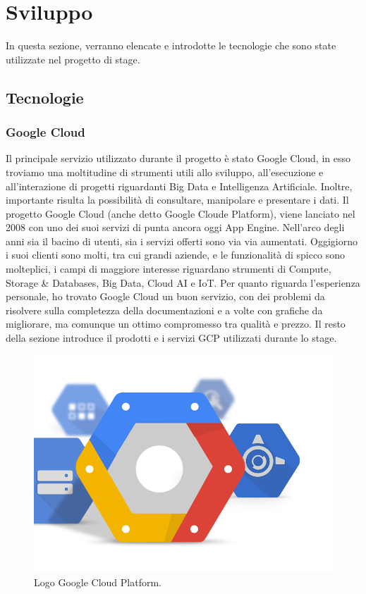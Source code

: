 \chapter{Sviluppo}
In questa sezione, verranno elencate e introdotte le tecnologie che sono state utilizzate nel progetto di stage.
\section{Tecnologie}
\subsection{Google Cloud}
Il principale servizio utilizzato durante il progetto è stato Google Cloud, in esso troviamo una moltitudine di strumenti utili allo sviluppo, all'esecuzione e all'interazione di progetti riguardanti Big Data e Intelligenza Artificiale. Inoltre, importante risulta la possibilità di consultare, manipolare e presentare i dati.
Il progetto Google Cloud (anche detto Google Cloude Platform), viene lanciato nel 2008 con uno dei suoi servizi di punta ancora oggi  \gls{App Engine}. Nell'arco degli anni sia il bacino di utenti, sia i servizi offerti sono via via aumentati. Oggigiorno i suoi clienti \cite{clienti} sono molti, tra cui grandi aziende, e le funzionalità di spicco sono molteplici, i campi di maggiore interesse riguardano strumenti di Compute, Storage \& Databases, Big Data, Cloud AI e IoT.
Per quanto riguarda l'esperienza personale, ho trovato Google Cloud un buon servizio, con dei problemi da risolvere sulla completezza della documentazioni e a volte con grafiche da migliorare, ma comunque un ottimo compromesso tra qualità e prezzo.
Il resto della sezione introduce il prodotti e i servizi GCP utilizzati durante lo stage.
\begin{figure}
	\centering
	\includegraphics[scale=0.3]{figures/google-cloud-platform}
	\caption[Logo Google Cloud Platform.]{Logo Google Cloud Platform.
		\label{fig:logoGCP}}
\end{figure}	

